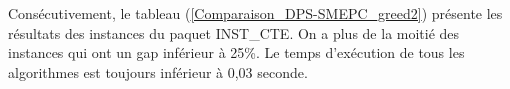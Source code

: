 Consécutivement, le tableau (\ref{Comparaison_DPS-SMEPC_greed2}) présente les résultats des instances du paquet INST\_CTE.
On a plus de la moitié des instances qui ont un gap inférieur à 25\%. 
Le temps d'exécution de tous les algorithmes est toujours inférieur à 0,03 seconde.%


